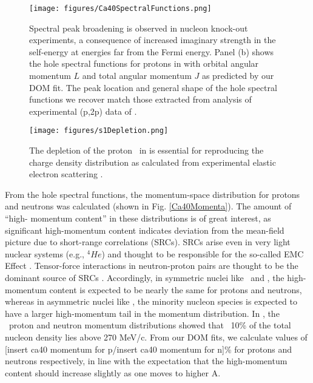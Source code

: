 \begin{figure}[ht!]
    \centering
    \texttt{[image: figures/Ca40SpectralFunctions.png]}
    \caption[Spectral peak broadening in \caForty: DOM prediction and experimental (p,2p) data]
    {
        Spectral peak broadening is observed in nucleon knock-out experiments, a 
        consequence of increased imaginary strength in the self-energy at energies far from the
        Fermi energy. Panel (b) shows the hole spectral functions for protons in \caForty
        with orbital angular momentum $L$ and total angular momentum $J$ as predicted by our DOM fit.
        The peak location and general shape of the hole spectral functions we recover match those
        extracted from analysis of experimental (p,2p) data of \cite{LiverpoolCa40}.
    }
    \label{Ca40SpectralFunctions}
\end{figure}

\begin{figure}[ht!]
    \centering
    \texttt{[image: figures/s1Depletion.png]}
    \caption[Depletion of proton \sOne\ in \caForty essential to reproduce charge density
    distribution]
    {
        The depletion of the proton \sOne\ in \caForty is essential
        for reproducing the charge density
        distribution as calculated from experimental elastic electron scattering \cite{DeVries1987}.
    }
    \label{s1Depletion}
\end{figure}

From the hole spectral functions, the momentum-space distribution for protons and neutrons was
calculated (shown in Fig. \ref{Ca40Momenta}). The amount of ``high-
momentum content'' in these distributions is of great interest, as significant high-momentum content 
indicates deviation from the mean-field picture due to short-range correlations (SRCs). SRCs arise 
even in very light nuclear systems (e.g., $^{4}He$)
and thought to be responsible for the so-called EMC Effect \cite{PRC_85_047301_OHen, 
PRC_86_065204_Arrington, CLAS2019}.
Tensor-force 
interactions in neutron-proton pairs are thought to be the dominant source of 
SRCs \cite{Subedi2008}. Accordingly, in symmetric nuclei like \cTwelve\ and \caForty, the
high-momentum content is expected to be nearly the same for protons and neutrons, whereas in
asymmetric nuclei like \pbEight, the minority nucleon species is expected to have a larger
high-momentum tail in the momentum distribution. In \cite{C12HighMomentum}, the \cTwelve\ proton and
neutron momentum distributions showed that ~10\% of the total nucleon density lies above 270 MeV/c.
From our DOM fits, we calculate values of [insert ca40 momentum for p/insert ca40 momentum for n]\%
for protons and neutrons respectively, in line with the expectation that the high-momentum content
should increase slightly as one moves to higher A.

